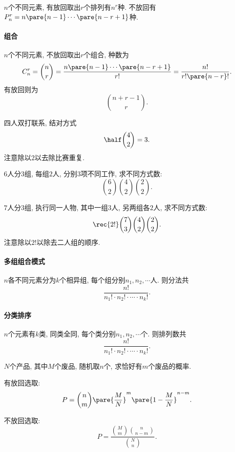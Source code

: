 \documentclass{ctexart}
\begin{document}
$n$个不同元素, 有放回取出$r$个排列有$n^r$种. 不放回有$P_n^r = n\pare{n-1}\cdots\pare{n-r+1}$种.   


\paragraph{组合} %
\label{par:组合}

$n$个不同元素, 不放回取出$r$个组合, 种数为
\[ C_n^r = \binom{n}{r} = \frac{n\pare{n-1}\cdots \pare{n-r+1}}{r!} = \frac{n!}{r!\pare{n-r}!}. \]
有放回则为
\[ \binom{n+r-1}{r}. \]


\begin{sample}
    \begin{ex}
        四人双打联系, 结对方式
        \[ \half\binom{4}{2} = 3. \]
        注意除以$2$以去除比赛重复.
    \end{ex}
    \begin{ex}
        $6$人分$3$组, 每组$2$人, 分别$3$项不同工作, 求不同方式数:
        \[ \binom{6}{2}\binom{4}{2}\binom{2}{2}. \]
    \end{ex}
    \begin{ex}
        $7$人分$3$组, 执行同一人物, 其中一组$3$人, 另两组各$2$人, 求不同方式数:
        \[ \rec{2!}\binom{7}{3}\binom{4}{2}\binom{2}{2}. \]
        注意除以$2!$以除去二人组的顺序.
    \end{ex}
\end{sample}
\paragraph{多组组合模式} %
\label{par:多组组合模式}

$n$各不同元素分为$k$个相异组, 每个组分别$n_1,n_2,\cdots$人. 则分法共
\[ \frac{n!}{n_1!\cdot n_2!\cdot\cdots\cdot n_k!}. \]


\paragraph{分类排序} %
\label{par:分类排序}

$n$个元素有$k$类, 同类全同, 每个类分别$n_1,n_2,\cdots$个. 则排列数共
\[ \frac{n!}{n_1!\cdot n_2!\cdot\cdots\cdot n_k!}. \]


\begin{sample}
    \begin{ex}
        $N$个产品, 其中$M$个废品, 随机取$n$个, 求恰好有$m$个废品的概率.
        \begin{cenum}
            \item 有放回选取:
            \[ P = \binom{n}{m}\pare{\frac{M}{N}}^m\pare{1-\frac{M}{N}}^{n-m}. \]
            \item 不放回选取:
            \[ P = \frac{\binom{M}{m}\binom{n}{n-m}}{\binom{N}{n}}. \]
        \end{cenum}
    \end{ex}
\end{sample}
\end{document}
